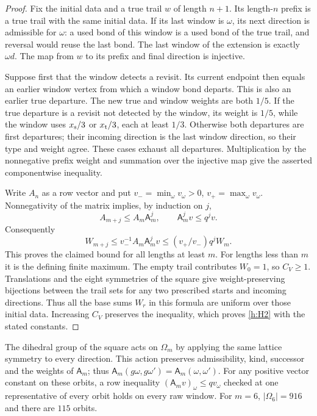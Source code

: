 \begin{proof}
Fix the initial data and a true trail \(w\) of length \(n+1\).
Its length-\(n\) prefix is a true trail with the same initial data.
If its last window is \(\omega\), its next direction is admissible
for \(\omega\): a used bond of this window is a used bond of the
true trail, and reversal would reuse the last bond. The last window
of the extension is exactly \(\omega d\). The map from \(w\) to its
prefix and final direction is injective.

Suppose first that the window detects a revisit. Its current endpoint
then equals an earlier window vertex from which a window bond departs.
This is also an earlier true departure. The new true and window
weights are both \(1/5\). If the true departure is a revisit not
detected by the window, its weight is \(1/5\), while the window
uses \(x_{\rm s}/3\) or \(x_{\rm t}/3\), each at least \(1/3\).
Otherwise both departures are first departures; their incoming
direction is the last window direction, so their type and weight
agree. These cases exhaust all departures. Multiplication by the
nonnegative prefix weight and summation over the injective map give
the asserted componentwise inequality.

Write \(A_n\) as a row vector and put
\(v_- =\min_\omega v_\omega>0\),
\(v_+=\max_\omega v_\omega\). Nonnegativity of the matrix implies,
by induction on \(j\),
\[
 A_{m+j}\le A_m\mathsf A_m^j,\qquad
 \mathsf A_m^jv\le q^jv .
\]
Consequently
\[
 W_{m+j}\le v_-^{-1}A_m\mathsf A_m^jv
       \le (v_+/v_-)q^jW_m .
\]
This proves the claimed bound for all lengths at least \(m\).
For lengths less than \(m\) it is the defining finite maximum.
The empty trail contributes \(W_0=1\), so \(C_V\ge1\).
Translations and the eight symmetries of the square give
weight-preserving bijections between the trail sets for any two
prescribed starts and incoming directions. Thus all the base sums
\(W_r\) in this formula are uniform over those initial data.
Increasing \(C_V\) preserves the inequality, which proves
\ref{h:H2} with the stated constants.
\end{proof}

\begin{lemma}\label{l:H2-dihedral}
The dihedral group of the square acts on \(\Omega_m\) by applying
the same lattice symmetry to every direction. This action preserves
admissibility, kind, successor and the weights of \(\mathsf A_m\);
thus \(\mathsf A_m(g\omega,g\omega')=\mathsf A_m(\omega,\omega')\).
For any positive vector constant on these orbits, a row inequality
\((\mathsf A_mv)_\omega\le qv_\omega\) checked at one representative
of every orbit holds on every raw window.
For \(m=6\), \(|\Omega_6|=916\) and there are \(115\) orbits.
\end{lemma}

